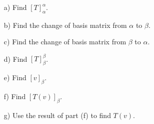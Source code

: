 \documentclass[12pt,a4paper]{article}
\begin{document}
\begin{enumerate}
\item[a)] Find $[T]_\alpha^\alpha$.
\item[b)]  Find the change of basis matrix from $\alpha$ to $\beta$.
\item[c)]  Find the change of basis matrix from $\beta$ to $\alpha$.
\item[d)]  Find $[T]_\beta^\beta$.
\item[e)] Find $[v]_\beta$.
\item[f)] Find $[T(v)]_\beta$.
\item[g)] Use the result of part (f) to find $T(v)$.
\end{enumerate}
\end{document}
